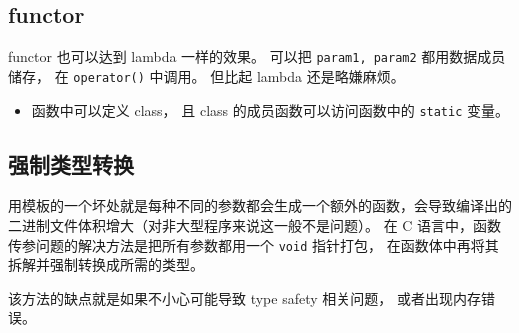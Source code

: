 \subsection{functor}
functor 也可以达到 lambda 一样的效果。 可以把 \verb`param1, param2` 都用数据成员储存， 在 \verb`operator()` 中调用。 但比起 lambda 还是略嫌麻烦。

\begin{itemize}
\item 函数中可以定义 class， 且 class 的成员函数可以访问函数中的 \verb`static` 变量。
\end{itemize}

\subsection{强制类型转换}
用模板的一个坏处就是每种不同的参数都会生成一个额外的函数，会导致编译出的二进制文件体积增大（对非大型程序来说这一般不是问题）。 在 C 语言中，函数传参问题的解决方法是把所有参数都用一个 \verb`void` 指针打包， 在函数体中再将其拆解并强制转换成所需的类型。

该方法的缺点就是如果不小心可能导致 type safety 相关问题， 或者出现内存错误。
